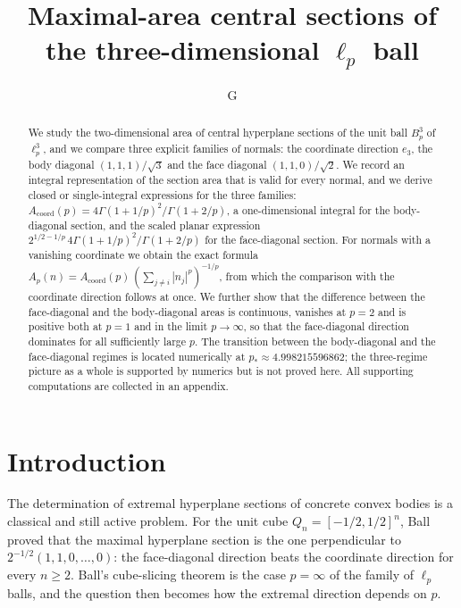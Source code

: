 \documentclass[11pt]{article}
\title{Maximal-area central sections of the three-dimensional $\ell_p$ ball}
\author{G}
\date{}
\theoremstyle{plain}
\numberwithin{theorem}{section}
\begin{document}
\maketitle

\begin{abstract}
We study the two-dimensional area of central hyperplane sections of the unit ball $B_p^3$ of $\ell_p^3$, and we compare three explicit families of normals: the coordinate direction $e_3$, the body diagonal $(1,1,1)/\sqrt3$ and the face diagonal $(1,1,0)/\sqrt2$. We record an integral representation of the section area that is valid for every normal, and we derive closed or single-integral expressions for the three families: $A_{\mathrm{coord}}(p)=4\Gamma(1+1/p)^2/\Gamma(1+2/p)$, a one-dimensional integral for the body-diagonal section, and the scaled planar expression $2^{1/2-1/p}\,4\Gamma(1+1/p)^2/\Gamma(1+2/p)$ for the face-diagonal section. For normals with a vanishing coordinate we obtain the exact formula $A_p(n)=A_{\mathrm{coord}}(p)\,(\sum_{j\ne i}|n_j|^p)^{-1/p}$, from which the comparison with the coordinate direction follows at once. We further show that the difference between the face-diagonal and the body-diagonal areas is continuous, vanishes at $p=2$ and is positive both at $p=1$ and in the limit $p\to\infty$, so that the face-diagonal direction dominates for all sufficiently large $p$. The transition between the body-diagonal and the face-diagonal regimes is located numerically at $p_*\approx 4.998215596862$; the three-regime picture as a whole is supported by numerics but is not proved here. All supporting computations are collected in an appendix.
\end{abstract}

\section{Introduction}

The determination of extremal hyperplane sections of concrete convex bodies is a classical and still active problem. For the unit cube $Q_n=[-1/2,1/2]^n$, Ball \cite{ball} proved that the maximal hyperplane section is the one perpendicular to $2^{-1/2}(1,1,0,\dots,0)$: the face-diagonal direction beats the coordinate direction for every $n\ge 2$. Ball's cube-slicing theorem is the case $p=\infty$ of the family of $\ell_p$ balls, and the question then becomes how the extremal direction depends on $p$.
\end{document}
